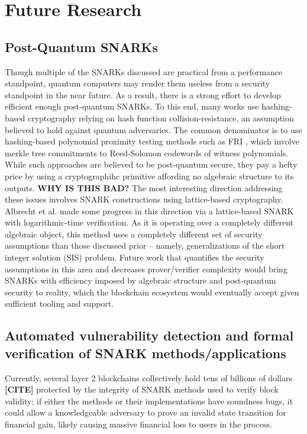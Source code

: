 \section{Future Research}

\subsection{Post-Quantum SNARKs}
\noindent Though multiple of the SNARKs discussed are practical from a performance standpoint, quantum computers may render them useless from a security standpoint in the near future. As a result, there is a strong effort to develop efficient enough post-quantum SNARKs. To this end, many works \cite{starks, ligero, fractal, spartan} use hashing-based cryptography relying on hash function collision-resistance, an assumption believed to hold against quantum adversaries. The common denominator is to use hashing-based polynomial proximity testing methods such as FRI \cite{FRI}, which involve merkle tree commitments to Reed-Solomon codewords of witness polynomials. While such approaches are believed to be post-quantum secure, they pay a hefty price by using a cryptographihc primitive affording no algebraic structure to its outputs. \textbf{WHY IS THIS BAD?} The most interesting direction addressing these issues involves SNARK constructions using lattice-based cryptography. Albrecht et al. \cite{lattice1} made some progress in this direction via a lattice-based SNARK with logarithmic-time verification. As it is operating over a completely different algebraic object, this method uses a completely different set of security assumptions than those discussed prior -- namely, generalizations of the short integer solution (SIS) problem. Future work that quantifies the security assumptions in this area and decreases prover/verifier complexity would bring SNARKs with efficiency imposed by algebraic structure and post-quantum security to reality, which the blockchain ecosystem would eventually accept given sufficient tooling and support.

\subsection{Automated vulnerability detection and formal verification of SNARK methods/applications}
\noindent Currently, several layer 2 blockchains collectively hold tens of billions of dollars \textbf{[CITE]} protected by the integrity of SNARK methods used to verify block validity; if either the methods or their implementations have soundness bugs, it could allow a knowledgeable adversary to prove an invalid state transition for financial gain, likely causing massive financial loss to users in the process. \\


